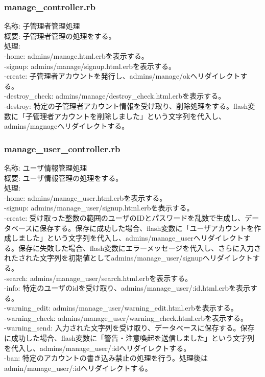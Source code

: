 \documentclass[a4j]{jarticle}
\begin{document}
\subsubsection{manage\_controller.rb}
\noindent 名称: 子管理者管理処理 \\
概要: 子管理者管理の処理をする。 \\
処理:  \\
-home: admins/manage.html.erbを表示する。\\
-signup: admins/manage/signup.html.erbを表示する。\\
-create: 子管理者アカウントを発行し、admins/manage/okへリダイレクトする。\\
-destroy\_check: admins/manage/destroy\_check.html.erbを表示する。\\
-destroy: 特定の子管理者アカウント情報を受け取り、削除処理をする。flash変数に「子管理者アカウントを削除しました」という文字列を代入し、admins/magnageへリダイレクトする。

\subsubsection{manage\_user\_controller.rb}
\noindent 名称: ユーザ情報管理処理 \\
概要: ユーザ情報管理の処理をする。 \\
処理:  \\
-home: admins/manage\_user.html.erbを表示する。\\
-signup: admins/manage\_user/signup.html.erbを表示する。\\
-create: 受け取った整数の範囲のユーザのIDとパスワードを乱数で生成し、データベースに保存する。保存に成功した場合、flash変数に「ユーザアカウントを作成しました」という文字列を代入し、admins/manage\_userへリダイレクトする。保存に失敗した場合、flash変数にエラーメッセージを代入し、さらに入力されたされた文字列を初期値としてadmins/manage\_user/signupへリダイレクトする。\\
-search: admins/manage\_user/search.html.erbを表示する。\\
-info: 特定のユーザのidを受け取り、admins/manage\_user/:id.html.erbを表示する。\\
-warning\_edit: admins/manage\_user/warning\_edit.html.erbを表示する。\\
-warning\_check: admins/manage\_user/warning\_check.html.erbを表示する。\\
-warning\_send: 入力された文字列を受け取り、データベースに保存する。保存に成功した場合、flash変数に「警告・注意喚起を送信しました」という文字列を代入し、admins/manage\_user/:idへリダイレクトする。\\
-ban: 特定のアカウントの書き込み禁止の処理を行う。処理後はadmin/manage\_user/:idへリダイレクトする。
\end{document}
